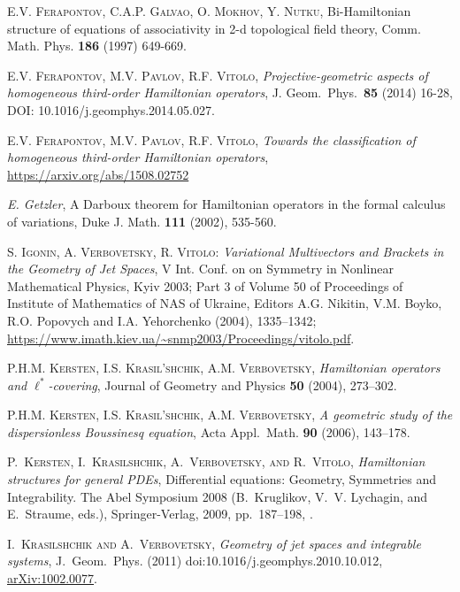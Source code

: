 \begin{thebibliography}{999}
 \textsc{E.V. Ferapontov, C.A.P. Galvao, O. Mokhov, Y. Nutku},
  Bi-Hamiltonian structure of equations of associativity in 2-d
  topological field theory, Comm. Math. Phys. \textbf{186 }(1997) 649-669.

 \textsc{E.V. Ferapontov, M.V. Pavlov, R.F. Vitolo},
\emph{Projective-geometric aspects of homogeneous third-order Hamiltonian
operators}, J. Geom.\ Phys.\ \textbf{85} (2014) 16-28, DOI:
10.1016/j.geomphys.2014.05.027.

 \textsc{E.V. Ferapontov, M.V. Pavlov, R.F. Vitolo},
\emph{Towards the classification of homogeneous third-order Hamiltonian
  operators}, \url{https://arxiv.org/abs/1508.02752}

 \emph{E. Getzler}, A Darboux theorem for Hamiltonian
operators in the formal calculus of variations, Duke J. Math. \textbf{111}
(2002), 535-560.

\textsc{S. Igonin, A. Verbovetsky, R. Vitolo:}
  \emph{Variational Multivectors and Brackets in the Geometry of Jet Spaces}, V
  Int. Conf. on on Symmetry in Nonlinear Mathematical Physics, Kyiv 2003; Part
  3 of Volume 50 of Proceedings of Institute of Mathematics of NAS of Ukraine,
  Editors A.G.  Nikitin, V.M. Boyko, R.O. Popovych and I.A. Yehorchenko (2004),
  1335--1342; \url{https://www.imath.kiev.ua/~snmp2003/Proceedings/vitolo.pdf}.

 \textsc{P.H.M. Kersten, I.S. Krasil'shchik, A.M. Verbovetsky,}
  \emph{Hamiltonian operators and $\ell^*$-covering}, Journal of Geometry and
  Physics \textbf{50} (2004), 273--302.

 \textsc{P.H.M. Kersten, I.S. Krasil'shchik, A.M. Verbovetsky,}
  \emph{A geometric study of the dispersionless Boussinesq equation}, Acta
  Appl.\ Math. \textbf{90} (2006), 143--178.

 \textsc{P.~Kersten,
  I.~Krasil{\cprime}shchik, A.~Verbovetsky, and R.~Vitolo}, \emph{Hamiltonian
    structures for general {PDE}s}, Differential equations: Geometry,
  Symmetries and Integrability. The Abel Symposium 2008 (B.~Kruglikov,
  V.~V. Lychagin, and E.~Straume, eds.), Springer-Verlag, 2009, pp.~187--198,
  .

 \textsc{I.~Krasil{\cprime}shchik and A.~Verbovetsky},
  \emph{Geometry of jet spaces and integrable systems}, J.\ Geom.\
  Phys. (2011) doi:10.1016/j.geomphys.2010.10.012, \url{arXiv:1002.0077}.


\end{thebibliography}
